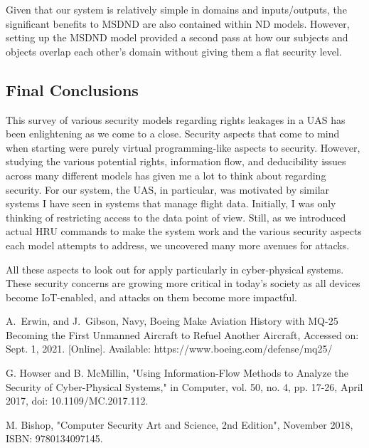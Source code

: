 \documentclass[10pt,journal,compsoc]{IEEEtran}
\begin{document}
Given that our system is relatively simple in domains and inputs/outputs, the significant benefits to MSDND are also contained within ND models. However, setting up the MSDND model provided a second pass at how our subjects and objects overlap each other's domain without giving them a flat security level. 

\subsection{Final Conclusions}

This survey of various security models regarding rights leakages in a UAS has been enlightening as we come to a close. Security aspects that come to mind when starting were purely virtual programming-like aspects to security. However, studying the various potential rights, information flow, and deducibility issues across many different models has given me a lot to think about regarding security. For our system, the UAS, in particular, was motivated by similar systems I have seen in systems that manage flight data. Initially, I was only thinking of restricting access to the data point of view. Still, as we introduced actual HRU commands to make the system work and the various security aspects each model attempts to address, we uncovered many more avenues for attacks.

All these aspects to look out for apply particularly in cyber-physical systems. These security concerns are growing more critical in today's society as all devices become IoT-enabled, and attacks on them become more impactful.

\ifCLASSOPTIONcaptionsoff
  \newpage
\fi

\begin{thebibliography}{1}

A.~Erwin, and J.~Gibson, Navy, Boeing Make Aviation History with MQ-25 Becoming the First Unmanned Aircraft to Refuel Another Aircraft, Accessed on: Sept. 1, 2021. [Online]. Available: https://www.boeing.com/defense/mq25/ 

G. Howser and B. McMillin, "Using Information-Flow Methods to Analyze the Security of Cyber-Physical Systems," in Computer, vol. 50, no. 4, pp. 17-26, April 2017, doi: 10.1109/MC.2017.112.

M. Bishop, "Computer Security Art and Science, 2nd Edition", November 2018, ISBN: 9780134097145.

\end{thebibliography}
\end{document}
